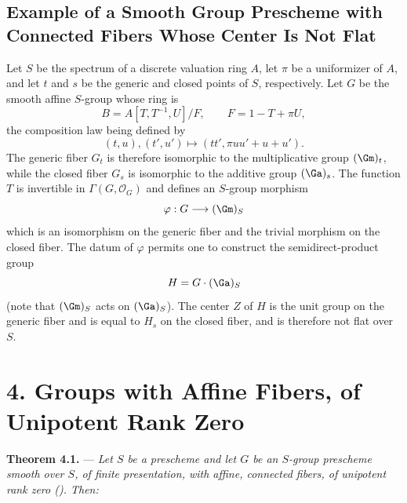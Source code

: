 \subsection*{Example of a Smooth Group Prescheme with Connected Fibers
Whose Center Is Not Flat}

Let \(S\) be the spectrum of a discrete valuation ring \(A\), let
\(\pi\) be a uniformizer of \(A\), and let \(t\) and \(s\) be the
generic and closed points of \(S\), respectively. Let \(G\) be the
smooth affine \(S\)-group whose ring is
\[
  B=A[T,T^{-1},U]/F,\qquad F=1-T+\pi U,
\]
the composition law being defined by
\[
  (t,u),(t',u')\longmapsto (tt',\pi uu'+u+u').
\]
The generic fiber \(G_t\) is therefore isomorphic to the
multiplicative group \((\Gm)_t\), while the closed fiber \(G_s\)
is isomorphic to the additive group \((\Ga)_s\). The function
\(T\) is invertible in \(\Gamma(G,\mathcal O_G)\) and defines an
\(S\)-group morphism
\[
  \varphi:G\longrightarrow(\Gm)_S
\]
which is an isomorphism on the generic fiber and the trivial
morphism on the closed fiber. The datum of \(\varphi\) permits one
to construct the semidirect-product group
\[
  H=G\cdot(\Ga)_S
\]
(note that \((\Gm)_S\) acts on \((\Ga)_S\)). The center \(Z\) of
\(H\) is the unit group on the generic fiber and is equal to
\(H_s\) on the closed fiber, and is therefore not flat over \(S\).



%
\section*{4. Groups with Affine Fibers, of Unipotent Rank Zero}

\noindent{}%
\textbf{Theorem 4.1.} --- \textit{Let \(S\) be a prescheme and
let \(G\) be an \(S\)-group prescheme smooth over \(S\), of finite
presentation, with affine, connected fibers, of unipotent rank
zero (). Then:}

